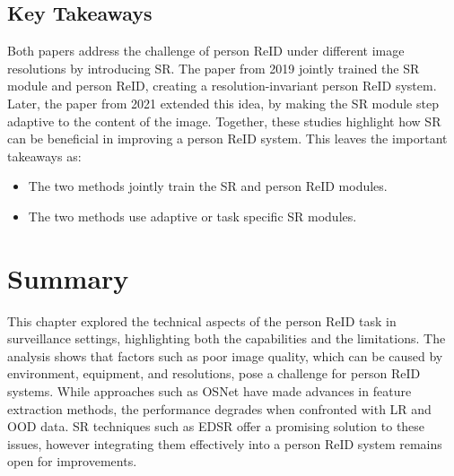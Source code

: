 \subsection{Key Takeaways}
Both papers address the challenge of person \acs{ReID} under different image resolutions by introducing \acs{SR}. The paper from 2019 jointly trained the \acs{SR} module and person \acs{ReID}, creating a resolution-invariant person \acs{ReID} system. Later, the paper from 2021 extended this idea, by making the \acs{SR} module step adaptive to the content of the image. Together, these studies highlight how \acs{SR} can be beneficial in improving a person \acs{ReID} system. This leaves the important takeaways as:

 \begin{itemize}
     \item The two methods jointly train the \acs{SR} and person \acs{ReID} modules. 
     \item The two methods use adaptive or task specific \acs{SR} modules. 
 \end{itemize} 

\section{Summary}
This chapter explored the technical aspects of the person \acs{ReID} task in surveillance settings, highlighting both the capabilities and the limitations. The analysis shows that factors such as poor image quality, which can be caused by environment, equipment, and resolutions, pose a challenge for person \acs{ReID} systems. While approaches such as \acs{OSNet} have made advances in feature extraction methods, the performance degrades when confronted with \acf{LR} and \acf{OOD} data. \acs{SR} techniques such as EDSR offer a promising solution to these issues, however integrating them effectively into a person \acs{ReID} system remains open for improvements.  
